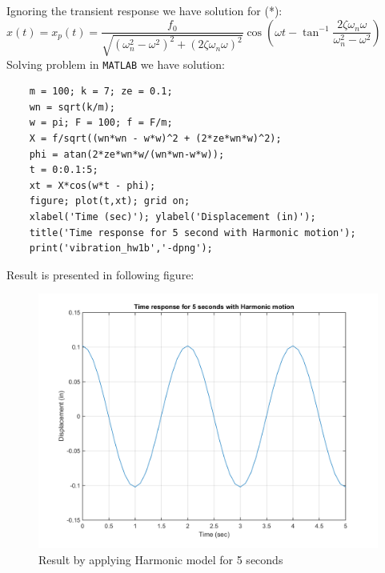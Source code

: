 \documentclass[14pt,a4paper]{article}
\begin{document}
\begin{enumerate}
	Ignoring the transient response we have solution for (*):\\
	\hspace*{2cm} $x(t) = x_p(t) = \dfrac{f_0}{\sqrt{(\omega_n^2 - \omega^2)^2 + (2\zeta\omega_n\omega)^2}} \cos\left( \omega t - \tan^{-1}\dfrac{2\zeta\omega_n\omega}{\omega_n^2 - \omega^2} \right)$\\
	Solving problem in \texttt{MATLAB} we have solution:
	\begin{lstlisting}
	m = 100; k = 7; ze = 0.1;
	wn = sqrt(k/m);
	w = pi; F = 100; f = F/m;
	X = f/sqrt((wn*wn - w*w)^2 + (2*ze*wn*w)^2);
	phi = atan(2*ze*wn*w/(wn*wn-w*w));
	t = 0:0.1:5;
	xt = X*cos(w*t - phi);
	figure; plot(t,xt); grid on;
	xlabel('Time (sec)'); ylabel('Displacement (in)');
	title('Time response for 5 second with Harmonic motion');
	print('vibration_hw1b','-dpng');
	\end{lstlisting}
	\label{Figure 2 - Harmonic}
	Result is presented in following figure:
	\begin{figure}[htp]
		\centering
		\includegraphics[scale =0.7]{vibration_hw1b.png}
		\caption{Result by applying Harmonic model for 5 seconds}
	\end{figure}
		

\end{enumerate}
\end{document}
